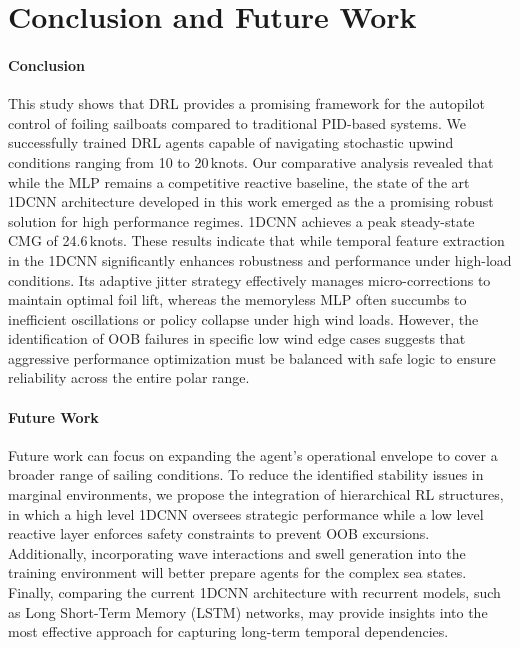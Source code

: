 \section{Conclusion and Future Work}

\paragraph{Conclusion}  This study shows that DRL provides a promising framework for the autopilot control of foiling sailboats compared to traditional PID-based systems. We successfully trained DRL agents capable of navigating stochastic upwind conditions ranging from 10 to 20\,knots. Our comparative analysis revealed that while the MLP remains a competitive reactive baseline, the state of the art 1DCNN architecture developed in this work emerged as the a promising robust solution for high performance regimes. 1DCNN achieves a peak steady-state CMG of 24.6\,knots. These results indicate that while temporal feature extraction in the 1DCNN significantly enhances robustness and performance under high-load conditions. Its adaptive jitter strategy effectively manages micro-corrections to maintain optimal foil lift, whereas the memoryless MLP often succumbs to inefficient oscillations or policy collapse under high wind loads. However, the identification of OOB failures in specific low wind edge cases suggests that aggressive performance optimization must be balanced with safe logic to ensure reliability across the entire polar range.

\paragraph{Future Work}  
Future work can focus on expanding the agent's operational envelope to cover a broader range of sailing conditions. To reduce the identified stability issues in marginal environments, we propose the integration of hierarchical RL structures, in which a high level 1DCNN oversees strategic performance while a low level reactive layer enforces safety constraints to prevent OOB excursions. Additionally, incorporating wave interactions and swell generation into the training environment will better prepare agents for the complex sea states. Finally, comparing the current 1DCNN architecture with recurrent models, such as Long Short-Term Memory (LSTM) networks, may provide insights into the most effective approach for capturing long-term temporal dependencies.


